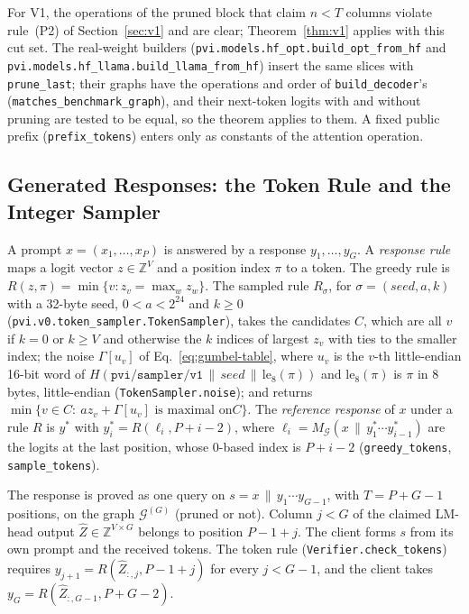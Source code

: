 \noindent For V1, the operations of the pruned block that claim $n<T$ columns violate rule~(P2) of
Section~\ref{sec:v1} and are clear; Theorem~\ref{thm:v1} applies with this cut set.
The real-weight builders (\texttt{pvi.models.hf\_opt.build\_opt\_from\_hf} and
\texttt{pvi.models.hf\_llama.build\_llama\_from\_hf}) insert the same slices with \texttt{prune\_last}; their
graphs have the operations and order of \texttt{build\_decoder}'s (\texttt{matches\_benchmark\_graph}),
and their next-token logits with and without pruning are tested to be equal, so the theorem applies to
them. A fixed public prefix (\texttt{prefix\_tokens}) enters only as constants of the attention
operation.

\subsection{Generated Responses: the Token Rule and the Integer Sampler}
\label{app:gen}

 A prompt $x=(x_1,\dots,x_P)$ is answered by a response
$y_1,\dots,y_G$. A \emph{response rule} maps a logit vector $z\in\mathbb Z^V$ and a position index
$\pi$ to a token. The greedy rule is $R(z,\pi)=\min\{v:z_v=\max_wz_w\}$. The sampled rule
$R_\sigma$, for $\sigma=(\mathit{seed},a,k)$ with a 32-byte seed, $0<a<2^{24}$ and $k\ge0$
(\texttt{pvi.v0.token\_sampler.TokenSampler}), takes the candidates $C$, which are all $v$ if $k=0$ or
$k\ge V$ and otherwise the $k$ indices of largest $z_v$ with ties to the smaller index; the noise
$\Gamma[u_v]$ of Eq.~\eqref{eq:gumbel-table}, where $u_v$ is the $v$-th little-endian 16-bit word of
$H(\texttt{pvi/sampler/v1}\,\|\,\mathit{seed}\,\|\,\mathrm{le}_8(\pi))$ and $\mathrm{le}_8(\pi)$ is
$\pi$ in 8 bytes, little-endian (\texttt{TokenSampler.noise}); and returns $\min\{v\in C:\ az_v+\Gamma[u_v]\text{ is maximal on
}C\}$. The \emph{reference response} of $x$ under a rule $R$ is $y^\ast$ with
$y^\ast_i=R(\ell_i,P+i-2)$, where $\ell_i=M_{\mathcal G}(x\,\|\,y^\ast_1\cdots y^\ast_{i-1})$ are the
logits at the last position, whose 0-based index is $P+i-2$ (\texttt{greedy\_tokens},
\texttt{sample\_tokens}).

 The response is proved as one query on $s=x\,\|\,y_1\cdots y_{G-1}$, with
$T=P+G-1$ positions, on the graph $\mathcal G^{(G)}$ (pruned or not). Column $j<G$ of the claimed
LM-head output $\hat Z\in\mathbb Z^{V\times G}$ belongs to position $P-1+j$. The client forms $s$
from its own prompt and the received tokens. The token rule (\texttt{Verifier.check\_tokens})
requires $y_{j+1}=R(\hat Z_{:,j},P-1+j)$ for every $j<G-1$, and the client takes
$y_G=R(\hat Z_{:,G-1},P+G-2)$.

